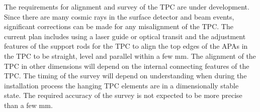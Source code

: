 The requirements for alignment and survey of the TPC are under development. Since there are many cosmic rays in the surface detector and beam events, significant corrections can be made for any misalignment of the TPC. The current plan includes using a laser guide or optical transit and the adjustment features of the support rods for the TPC to align the top edges of the APAs in the TPC to be straight, level and parallel within a few mm. The alignment of the TPC in other dimensions will depend on the internal connecting features of the TPC.  The timing of the survey will depend on understanding when during the installation process the hanging TPC elements are in a dimensionally stable state. The required accuracy of the survey is not expected to be more precise than a few mm.  





